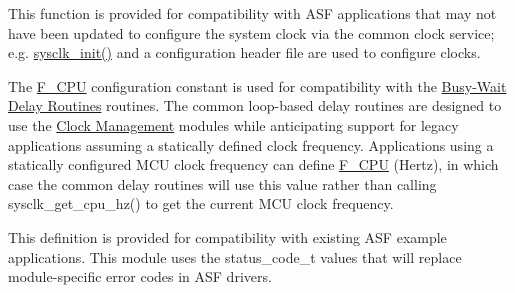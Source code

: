 
\begin{DoxyRefList}
\item[\label{deprecated__deprecated000002}%
\hypertarget{deprecated__deprecated000002}{}%
Member \hyperlink{group__group__common__services__delay_ga62d461b94db6352d8ed8442d62ea39fb}{delay\-\_\-init} (fcpu\-\_\-hz)]This function is provided for compatibility with A\-S\-F applications that may not have been updated to configure the system clock via the common clock service; e.\-g. \hyperlink{group__sysclk__group_ga242399e48a97739c88b4d0c00f6101de}{sysclk\-\_\-init()} and a configuration header file are used to configure clocks. 
\item[\label{deprecated__deprecated000001}%
\hypertarget{deprecated__deprecated000001}{}%
Member \hyperlink{group__group__common__services__delay_ga43bafb28b29491ec7f871319b5a3b2f8}{F\-\_\-\-C\-P\-U} ]The \hyperlink{group__group__common__services__delay_ga43bafb28b29491ec7f871319b5a3b2f8}{F\-\_\-\-C\-P\-U} configuration constant is used for compatibility with the \hyperlink{group__group__common__services__delay}{Busy-\/\-Wait Delay Routines} routines. The common loop-\/based delay routines are designed to use the \hyperlink{group__clk__group}{Clock Management} modules while anticipating support for legacy applications assuming a statically defined clock frequency. Applications using a statically configured M\-C\-U clock frequency can define \hyperlink{group__group__common__services__delay_ga43bafb28b29491ec7f871319b5a3b2f8}{F\-\_\-\-C\-P\-U} (Hertz), in which case the common delay routines will use this value rather than calling sysclk\-\_\-get\-\_\-cpu\-\_\-hz() to get the current M\-C\-U clock frequency.  
\item[\label{deprecated__deprecated000003}%
\hypertarget{deprecated__deprecated000003}{}%
Member \hyperlink{group__group__xmega__drivers__twi__twim_gae4fbb549f8f2ecf379b60922b20e911f}{T\-W\-I\-\_\-\-S\-U\-C\-C\-E\-S\-S} ]This definition is provided for compatibility with existing A\-S\-F example applications. This module uses the status\-\_\-code\-\_\-t values that will replace module-\/specific error codes in A\-S\-F drivers. 
\end{DoxyRefList}